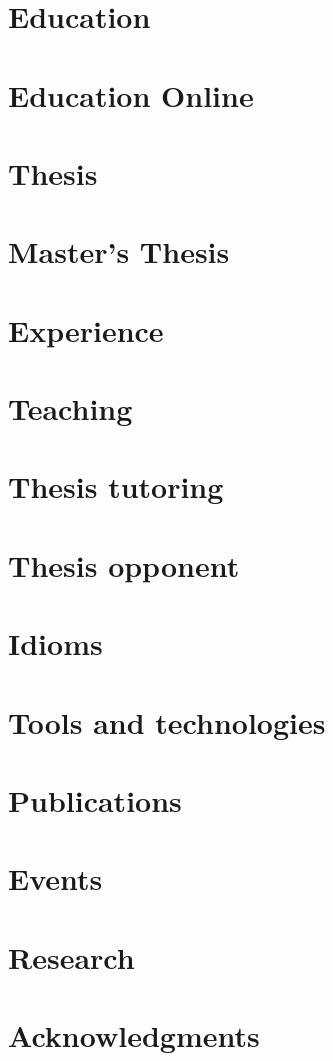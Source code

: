 \makecvtitle

\section{Education}

\section{Education Online}

\section{Thesis}


\section{Master's Thesis}

\section{Experience}


\section{Teaching}

\section{Thesis tutoring}

\section{Thesis opponent}


\section{Idioms}

\section{Tools and technologies}

\section{Publications}

\section{Events}

\section{Research}

\section{Acknowledgments}
